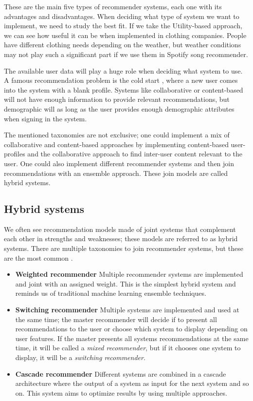 \documentclass{tex_files/kththesis}
\begin{document}
These are the main five types of recommender systems, each one with its advantages and disadvantages. When deciding what type of system we want to implement, we need to study the best fit. If we take the Utility-based approach, we can see how useful it can be when implemented in clothing companies. People have different clothing needs depending on the weather, but weather conditions may not play such a significant part if we use them in Spotify song recommender.

The available user data will play a huge role when deciding what system to use. A famous recommendation problem is the cold start \cite{coldstart}, where a new user comes into the system with a blank profile. Systems like collaborative or content-based will not have enough information to provide relevant recommendations, but demographic will as long as the user provides enough demographic attributes when signing in the system.

The mentioned taxonomies are not exclusive; one could implement a mix of collaborative and content-based approaches by implementing content-based user-profiles and the collaborative approach to find inter-user content relevant to the user. One could also implement different recommender systems and then join recommendations with an ensemble approach. These join models are called hybrid systems.

\subsection{Hybrid systems}
We often see recommendation models made of joint systems that complement each other in strengths and weaknesses; these models are referred to as hybrid systems. There are multiple taxonomies to join recommender systems, but these are the most common \cite{Burke_hybrid}.

\begin{itemize}
    \item \textbf{Weighted recommender} Multiple recommender systems are implemented and joint with an assigned weight. This is the simplest hybrid system and reminds us of traditional machine learning ensemble techniques.
    
    \item \textbf{Switching recommender} Multiple systems are implemented and used at the same time; the master recommender will decide if to present all recommendations to the user or choose which system to display depending on user features. If the master presents all systems recommendations at the same time, it will be called a \textit{mixed recommender}, but if it chooses one system to display, it will be a \textit{switching recommender}.
    \item \textbf{Cascade recommender} Different systems are combined in a cascade architecture where the output of a system as input for the next system and so on. This system aims to optimize results by using multiple approaches.
\end{itemize}
\end{document}
